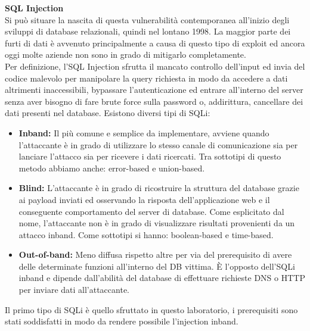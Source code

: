     \noindent
    {\bfseries\Large{SQL Injection}}\\[1em]
    Si può situare la nascita di questa vulnerabilità contemporanea all'inizio degli sviluppi di database relazionali, quindi nel lontano 1998. La maggior parte dei furti di dati è avvenuto principalmente a causa di questo tipo di exploit ed ancora oggi molte aziende non sono in grado di mitigarlo completamente.\\
    Per definizione, l'SQL Injection sfrutta il mancato controllo dell'input ed invia del codice malevolo per manipolare la query richiesta in modo da accedere a dati altrimenti inaccessibili, bypassare l'autenticazione ed entrare all'interno del server senza aver bisogno di fare brute force sulla password o, addirittura, cancellare dei dati presenti nel database. Esistono diversi tipi di SQLi:
    \begin{itemize}
        \item \textbf{Inband:} Il più comune e semplice da implementare, avviene quando l'attaccante è in grado di utilizzare lo stesso canale di comunicazione sia per lanciare l'attacco sia per ricevere i dati ricercati. Tra sottotipi di questo metodo abbiamo anche: error-based e union-based.
        \item \textbf{Blind:} L'attaccante è in grado di ricostruire la struttura del database grazie ai payload inviati ed osservando la risposta dell'applicazione web e il conseguente comportamento del server di database. Come esplicitato dal nome, l'attaccante non è in grado di visualizzare risultati provenienti da un attacco inband. Come sottotipi si hanno: boolean-based e time-based.
        \item \textbf{Out-of-band:} Meno diffusa rispetto altre per via del prerequisito di avere delle determinate funzioni all'interno del DB vittima. È l'opposto dell'SQLi inband e dipende dall'abilità del database di effettuare richieste DNS o HTTP per inviare dati all'attaccante.
    \end{itemize}
    Il primo tipo di SQLi è quello sfruttato in questo laboratorio, i prerequisiti sono stati soddisfatti in modo da rendere possibile l'injection inband.

    
